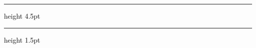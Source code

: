 \begin{center}
\chaptitlefont
\begin{center}\textcolor{black}{\textsc{\thesisTitleEn}}
\end{center}
\end{center}
\vspace{8mm}
\textcolor{black}{\hrule height 4.5pt}%
\vspace{1mm}
\textcolor{black}{\hrule height 1.5pt}
